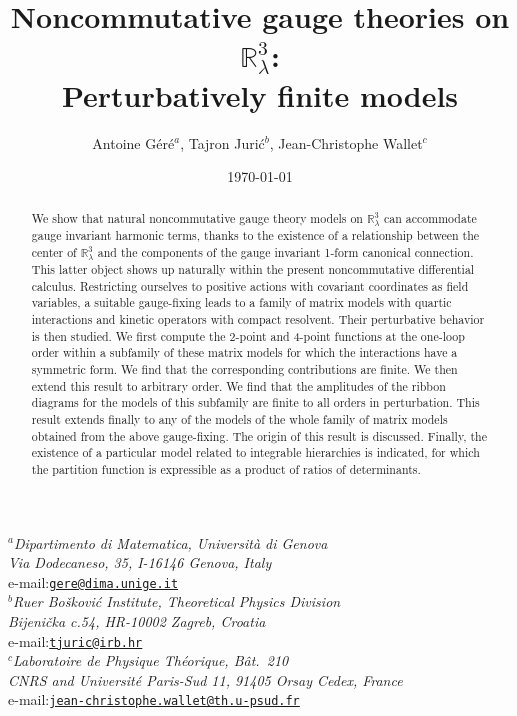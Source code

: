 \documentclass[a4paper,11pt,twoside]{article}
\makeatletter
\numberwithin{equation}{section}
\theoremstyle{nonumberplain}
\newcounter{and}
\newcommand{\institute}[1]{\newcommand{\@institute}{#1}}
\renewcommand{\maketitle}{
%
\vspace*{0.5\baselineskip}
%
{%
\center\LARGE\noindent\@title\par
}%
%
\vspace{1.5\baselineskip}
%
{%
\center\normalsize\noindent\ignorespaces\@author\par
}%
%
\vspace{0.5\baselineskip}
%
{%
\center\normalsize\ignorespaces\@institute\par
}%
%
\vspace{2\baselineskip}
%
}%
\makeatother
\begin{document}

\title{Noncommutative gauge theories on $\mathbb{R}^3_\lambda$: \\
Perturbatively finite models}

\author{Antoine G\'er\'e$^a$, Tajron Juri\'c$^b$, Jean-Christophe Wallet$^c$}

\institute{%
%
\textit{$^a$Dipartimento di Matematica, Universit\`a di Genova\\
Via Dodecaneso, 35, I-16146 Genova, Italy}\\
e-mail:\href{mailto:gere@dima.unige.it}{\texttt{gere@dima.unige.it}}\\[1ex]%
%
\textit{$^b$Ru\dj er Bo\v{s}kovi\'c Institute, Theoretical Physics Division\\
Bijeni\v{c}ka c.54, HR-10002 Zagreb, Croatia}\\
e-mail:\href{mailto:tjuric@irb.hr}{\texttt{tjuric@irb.hr}}\\[1ex]%
%
\textit{$^c$Laboratoire de Physique Th\'eorique, B\^at.\ 210\\
CNRS and Universit\'e Paris-Sud 11,  91405 Orsay Cedex, France}\\
e-mail:\href{mailto:jean-christophe.wallet@th.u-psud.fr}{\texttt{jean-christophe.wallet@th.u-psud.fr}}\\[1ex]%
%
}%

\date{\today}

\maketitle

\begin{abstract} 
We show that natural noncommutative gauge theory models on $\mathbb{R}^3_\lambda$ can accommodate gauge invariant harmonic terms, thanks to the existence of a relationship between the center of $\mathbb{R}^3_\lambda$ and the components of the gauge invariant 1-form canonical connection. This latter object shows up naturally within the present noncommutative differential calculus. Restricting ourselves to positive actions with covariant coordinates as field variables, a suitable gauge-fixing leads to a family of matrix models with quartic interactions and kinetic operators with compact resolvent. Their perturbative behavior is then studied. We first compute the 2-point and 4-point functions at the one-loop order within a subfamily of these matrix models for which the interactions have a symmetric form. We find that the corresponding contributions are finite. We then extend this result to arbitrary order. We find that the amplitudes of the ribbon diagrams for the models of this subfamily are finite to all orders in perturbation. This result extends finally to any of the models of the whole family of matrix models obtained from the above gauge-fixing. The origin of this result is discussed. Finally, the existence of a particular model related to integrable hierarchies is indicated, for which the partition function is expressible as a product of ratios of determinants.

\end{abstract}
\end{document}
